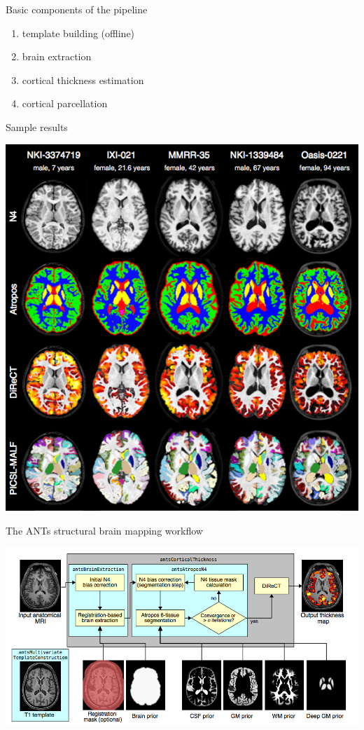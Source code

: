 \documentclass[ignorenonframetext,]{beamer}
\providecommand{\tightlist}{%
  \setlength{\itemsep}{0pt}\setlength{\parskip}{0pt}}
\begin{document}
\begin{frame}{Basic components of the pipeline}

\begin{enumerate}
\def\labelenumi{\arabic{enumi}.}
\tightlist
\item
  template building (offline)
\item
  brain extraction
\item
  cortical thickness estimation
\item
  cortical parcellation
\end{enumerate}

\end{frame}

\begin{frame}{Sample results}

\includegraphics{./evaluation/figures/components.png}

\end{frame}

\begin{frame}{The ANTs structural brain mapping workflow}

\includegraphics{./evaluation/figures/pipeline.png}

\end{frame}
\end{document}
